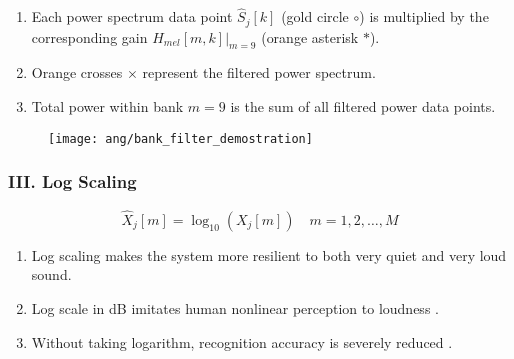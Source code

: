 
\begin{frame}
\begin{enumerate}
\item Each power spectrum data point $\hat{S}_j[k]$ (\textcolor{gold_matlab}{gold circle $\circ$}) is multiplied by the corresponding gain $H_{mel}[m, k]|_{m=9}$ (\textcolor{orange_matlab}{orange asterisk $*$}).
\item \textcolor{orange_matlab}{Orange crosses $\times$} represent the filtered power spectrum.
\item Total power within bank $m=9$ is the sum of all filtered power data points.
\end{enumerate}

\begin{figure}[H]
\centering
\texttt{[image: ang/bank\_filter\_demostration]}
\end{figure}
\end{frame}


\begin{frame}
\frametitle{III. Log Scaling}
\begin{equation}
\hat{X}_j[m] = \log_{10}(X_j[m]) \quad m = 1, 2, \dots, M
\end{equation}

\begin{enumerate}
\item Log scaling makes the system more resilient to both very quiet and very loud sound.
\item Log scale in dB imitates human nonlinear perception to loudness \cite{farin2008mathematical}.
\item Without taking logarithm, recognition accuracy is severely reduced \cite{tan2008automatic}.
\end{enumerate}
\end{frame}


